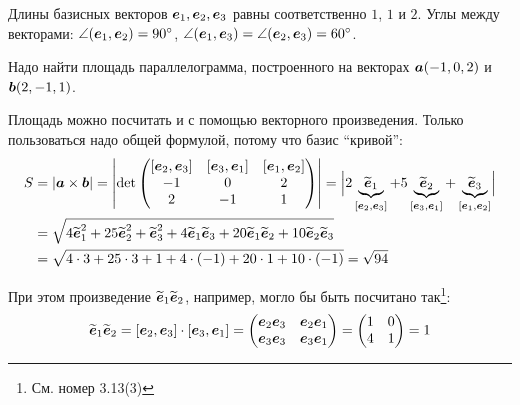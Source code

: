\documentclass[a4paper,12pt]{article}
\begin{document}
  \begin{problem}
    Длины базисных векторов $\boldsymbol e_1, \boldsymbol e_2, \boldsymbol e_3$ равны соответственно $1$, $1$ и $2$.
    Углы между векторами: $\angle (\bds e_1, \bds e_2) \hm= 90\degree$, $\angle (\bds e_1, \bds e_3) \hm= \angle (\bds e_2, \bds e_3) \hm= 60\degree$.
    
    Надо найти площадь параллелограмма, построенного на векторах $\boldsymbol a (-1, 0, 2)$ и $\boldsymbol b (2, -1, 1)$.
  \end{problem}
  
  \begin{solution}
    Площадь можно посчитать и с помощью векторного произведения.
    Только пользоваться надо общей формулой, потому что базис ``кривой'':
    \begin{equation*}
    \begin{split}
      S &= |\bds a \times \bds b| = \left|
        \det \begin{pmatrix}
          [\bds e_2, \bds e_3] & [\bds e_3, \bds e_1] & [\bds e_1, \bds e_2]\\
          -1 & 0 & 2\\
          2 & -1 & 1
        \end{pmatrix}
      \right|
      = \Bigl|2 \underbrace{\widetilde{\bds e}_1}_{[\bds e_2, \bds e_3]}
        + 5 \underbrace{\widetilde{\bds e}_2}_{[\bds e_3, \bds e_1]}
        + \underbrace{\widetilde{\bds e}_3}_{[\bds e_1, \bds e_2]}\Bigr|\\  %
      &= \sqrt{4 \widetilde{\bds e}_1^2 + 25 \widetilde{\bds e}_2^2 + \widetilde{\bds e}_3^2 + 4 \widetilde{\bds e}_1 \widetilde{\bds e}_3 + 20 \widetilde{\bds e}_1 \widetilde{\bds e}_2 + 10 \widetilde{\bds e}_2 \widetilde{\bds e}_3}\\
      &= \sqrt{4 \cdot 3 + 25 \cdot 3 + 1 + 4 \cdot (-1) + 20 \cdot 1 + 10 \cdot (-1)} = \sqrt{94}
    \end{split}
    \end{equation*}
    
    При этом произведение $\widetilde{\boldsymbol e}_1 \widetilde{\boldsymbol e}_2$, например, могло бы быть посчитано так\footnote{См. номер 3.13(3)}:
    \[
      \widetilde{\boldsymbol e}_1 \widetilde{\boldsymbol e}_2 = [\boldsymbol e_2, \boldsymbol e_3] \cdot [\boldsymbol e_3, \boldsymbol e_1]
        = \begin{pmatrix}
          \boldsymbol e_2 \boldsymbol e_3 & \boldsymbol e_2 \boldsymbol e_1\\
          \boldsymbol e_3 \boldsymbol e_3 & \boldsymbol e_3 \boldsymbol e_1
        \end{pmatrix}
        = \begin{pmatrix}
          1 & 0\\
          4 & 1
        \end{pmatrix}
        = 1
    \]
  \end{solution}
  
\end{document}

